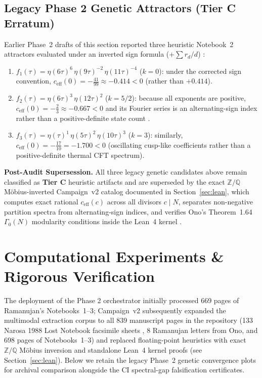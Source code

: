 \documentclass[11pt,a4paper]{article}
\theoremstyle{plain}
\theoremstyle{definition}
\theoremstyle{remark}
\newcommand{\tierC}{\textbf{Tier C}}
\begin{document}
\subsection{Legacy Phase 2 Genetic Attractors (\tierC{} Erratum)}

Earlier Phase~2 drafts of this section reported three heuristic Notebook~2 attractors evaluated under an inverted sign formula ($+\sum r_d/d$) \cite{EOT2011}:
\begin{enumerate}
    \item $f_1(\tau) = \eta(6\tau)^6\,\eta(9\tau)^{-2}\,\eta(11\tau)^{-4}$ ($k = 0$): under the corrected sign convention, $c_{\text{eff}}(0) = -\frac{41}{99} \approx -0.414 < 0$ (rather than $+0.414$).
    \item $f_2(\tau) = \eta(6\tau)^3\,\eta(12\tau)^2$ ($k = 5/2$): because all exponents are positive, $c_{\text{eff}}(0) = -\frac{2}{3} \approx -0.667 < 0$ and its Fourier series is an alternating-sign index rather than a positive-definite state count \cite{Zwegers2002}.
    \item $f_3(\tau) = \eta(\tau)^1\,\eta(5\tau)^2\,\eta(10\tau)^3$ ($k = 3$): similarly, $c_{\text{eff}}(0) = -\frac{17}{10} = -1.700 < 0$ (oscillating cusp-like coefficients rather than a positive-definite thermal CFT spectrum).
\end{enumerate}

\noindent\textbf{Post-Audit Supersession.} All three legacy genetic candidates above remain classified as \tierC{} heuristic artifacts and are superseded by the exact $\mathbb{Z}/\mathbb{Q}$ M\"{o}bius-inverted Campaign~v2 catalog documented in Section~\ref{sec:lean}, which computes exact rational $c_{\text{eff}}(c)$ across all divisors $c \mid N$, separates non-negative partition spectra from alternating-sign indices, and verifies Ono's Theorem~1.64 $\Gamma_0(N)$ modularity conditions inside the Lean~4 kernel \cite{GPPV2020}.

\section{Computational Experiments \& Rigorous Verification}
\label{sec:experiments}

The deployment of the Phase 2 orchestrator initially processed 669 pages of Ramanujan's Notebooks~1--3; Campaign~v2 subsequently expanded the multimodal extraction corpus to all 839 manuscript pages in the repository (133 Narosa 1988 Lost Notebook facsimile sheets \cite{Narosa1988}, 8 Ramanujan letters from Ono, and 698 pages of Notebooks~1--3) and replaced floating-point heuristics with exact $\mathbb{Z}/\mathbb{Q}$ M\"{o}bius inversion and standalone Lean~4 kernel proofs (see Section~\ref{sec:lean}). Below we retain the legacy Phase~2 genetic convergence plots for archival comparison alongside the CI spectral-gap falsification certificates.
\end{document}
